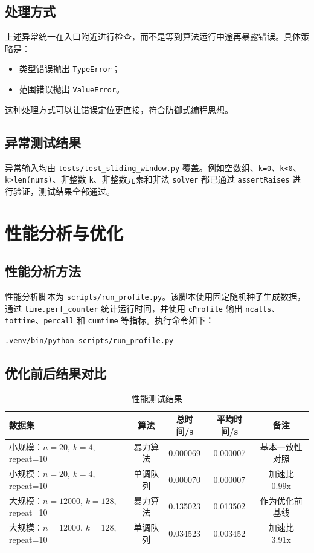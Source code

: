 \documentclass[UTF8,a4paper,12pt]{ctexart}
\begin{document}
\subsection{处理方式}
上述异常统一在入口附近进行检查，而不是等到算法运行中途再暴露错误。具体策略是：
\begin{itemize}
    \item 类型错误抛出 \texttt{TypeError}；
    \item 范围错误抛出 \texttt{ValueError}。
\end{itemize}
这种处理方式可以让错误定位更直接，符合防御式编程思想。

\subsection{异常测试结果}
异常输入均由 \texttt{tests/test\_sliding\_window.py} 覆盖。例如空数组、\texttt{k=0}、\texttt{k<0}、\texttt{k>len(nums)}、非整数 \texttt{k}、非整数元素和非法 \texttt{solver} 都已通过 \texttt{assertRaises} 进行验证，测试结果全部通过。

\section{性能分析与优化}
\subsection{性能分析方法}
性能分析脚本为 \texttt{scripts/run\_profile.py}。该脚本使用固定随机种子生成数据，通过 \texttt{time.perf\_counter} 统计运行时间，并使用 \texttt{cProfile} 输出 \texttt{ncalls}、\texttt{tottime}、\texttt{percall} 和 \texttt{cumtime} 等指标。执行命令如下：

\begin{lstlisting}[language=bash]
.venv/bin/python scripts/run_profile.py
\end{lstlisting}

\subsection{优化前后结果对比}
\begin{table}[h]
    \centering
    \begin{tabularx}{\textwidth}{>{\raggedright\arraybackslash}p{3.4cm}cccc}
        \toprule
        数据集 & 算法 & 总时间/s & 平均时间/s & 备注 \\
        \midrule
        小规模：\(n=20\), \(k=4\), repeat=10 & 暴力算法 & 0.000069 & 0.000007 & 基本一致性对照 \\
        小规模：\(n=20\), \(k=4\), repeat=10 & 单调队列 & 0.000070 & 0.000007 & 加速比 0.99x \\
        大规模：\(n=12000\), \(k=128\), repeat=10 & 暴力算法 & 0.135023 & 0.013502 & 作为优化前基线 \\
        大规模：\(n=12000\), \(k=128\), repeat=10 & 单调队列 & 0.034523 & 0.003452 & 加速比 3.91x \\
        \bottomrule
    \end{tabularx}
    \caption{性能测试结果}
\end{table}
\end{document}
